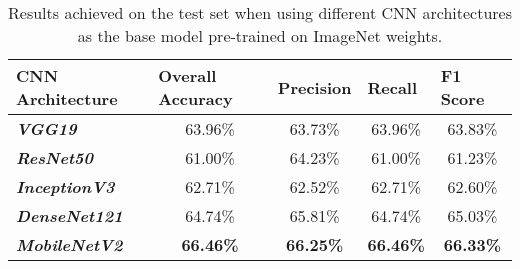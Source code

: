\begin{table}[h]
\centering
\begin{tabular}{@{}lcccc@{}}
\toprule
\textbf{CNN Architecture} &
  \multicolumn{1}{l}{\textbf{Overall Accuracy}} &
  \multicolumn{1}{l}{\textbf{Precision}} &
  \multicolumn{1}{l}{\textbf{Recall}} &
  \multicolumn{1}{l}{\textbf{F1 Score}} \\ \midrule
\textit{\textbf{VGG19}}       & 63.96\%          & 63.73\%          & 63.96\%          & 63.83\%          \\
\textit{\textbf{ResNet50}}    & 61.00\%          & 64.23\%          & 61.00\%          & 61.23\%          \\
\textit{\textbf{InceptionV3}} & 62.71\%          & 62.52\%          & 62.71\%          & 62.60\%          \\
\textit{\textbf{DenseNet121}} & 64.74\%          & 65.81\%          & 64.74\%          & 65.03\%          \\
\textit{\textbf{MobileNetV2}} & \textbf{66.46\%} & \textbf{66.25\%} & \textbf{66.46\%} & \textbf{66.33\%} \\ \bottomrule
\end{tabular}
\caption{Results achieved on the test set when using different CNN architectures as the base model pre-trained on ImageNet weights.}
\label{tab:evaluation-cnn-models}
\end{table}